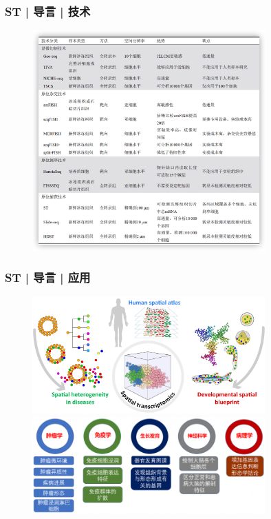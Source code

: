 \documentclass[11pt]{ctexbeamer}
\begin{document}
\begin{frame}
	\frametitle{ST | 导言 | 技术}
		\begin{figure}
		\includegraphics[width=0.8\textwidth]{ST_tech_01.png}
	\end{figure}
\end{frame}

\begin{frame}
	\frametitle{ST | 导言 | 应用}
			\begin{figure}
		\includegraphics[width=0.8\textwidth]{ST_application_01.png}
		\includegraphics[width=0.8\textwidth]{ST_application_05.png}
	\end{figure}
\end{frame}
\end{document}
